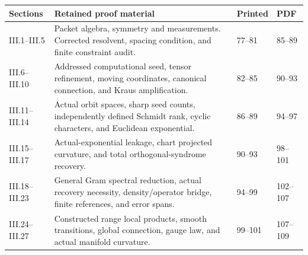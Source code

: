 {\small\begin{longtable}{@{}p{.14\linewidth}p{.51\linewidth}p{.14\linewidth}p{.12\linewidth}@{}}\toprule Sections & Retained proof material & Printed & PDF\\\midrule\endhead
III.1–III.5 & Packet algebra, symmetry and measurements. Corrected resolvent, spacing condition, and finite constraint audit. & 77–81 & 85–89\\
III.6–III.10 & Addressed computational seed, tensor refinement, moving coordinates, canonical connection, and Kraus amplification. & 82–85 & 90–93\\
III.11–III.14 & Actual orbit spaces, sharp seed counts, independently defined Schmidt rank, cyclic characters, and Euclidean exponential. & 86–89 & 94–97\\
III.15–III.17 & Actual-exponential leakage, chart projected curvature, and total orthogonal-syndrome recovery. & 90–93 & 98–101\\
III.18–III.23 & General Gram spectral reduction, actual recovery necessity, density/operator bridge, finite references, and error spans. & 94–99 & 102–107\\
III.24–III.27 & Constructed range local products, smooth transitions, global connection, gauge law, and actual manifold curvature. & 99–101 & 107–109\\
\bottomrule\end{longtable}}
